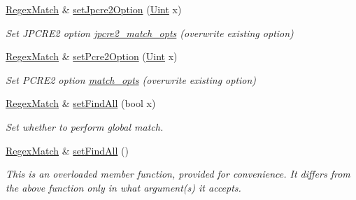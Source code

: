 \begin{DoxyCompactItemize}
\hyperlink{classjpcre2_1_1RegexMatch}{Regex\+Match} \& \hyperlink{classjpcre2_1_1RegexMatch_a0d76033d9c134caa9ddfc21849603920_a0d76033d9c134caa9ddfc21849603920}{set\+Jpcre2\+Option} (\hyperlink{namespacejpcre2_a078242d38221a13fb3543b9edd78c099}{Uint} x)
\begin{DoxyCompactList}\small\item\em Set J\+P\+C\+R\+E2 option \hyperlink{classjpcre2_1_1RegexMatch_a70d62df887eeed237724f64fbc378700}{jpcre2\+\_\+match\+\_\+opts} (overwrite existing option) \end{DoxyCompactList}\item 
\hyperlink{classjpcre2_1_1RegexMatch}{Regex\+Match} \& \hyperlink{classjpcre2_1_1RegexMatch_ae4ab558c2bec0bc9639dbca70ab47496_ae4ab558c2bec0bc9639dbca70ab47496}{set\+Pcre2\+Option} (\hyperlink{namespacejpcre2_a078242d38221a13fb3543b9edd78c099}{Uint} x)
\begin{DoxyCompactList}\small\item\em Set P\+C\+R\+E2 option \hyperlink{classjpcre2_1_1RegexMatch_a697d5731007350b0f20d2018fcfafa90}{match\+\_\+opts} (overwrite existing option) \end{DoxyCompactList}\item 
\hyperlink{classjpcre2_1_1RegexMatch}{Regex\+Match} \& \hyperlink{classjpcre2_1_1RegexMatch_ae586d43ec197c57c66086eeb4f8d83a1_ae586d43ec197c57c66086eeb4f8d83a1}{set\+Find\+All} (bool x)
\begin{DoxyCompactList}\small\item\em Set whether to perform global match. \end{DoxyCompactList}\item 
\hyperlink{classjpcre2_1_1RegexMatch}{Regex\+Match} \& \hyperlink{classjpcre2_1_1RegexMatch_a9e04456a81606362a2ecdf748912e3ea_a9e04456a81606362a2ecdf748912e3ea}{set\+Find\+All} ()
\begin{DoxyCompactList}\small\item\em This is an overloaded member function, provided for convenience. It differs from the above function only in what argument(s) it accepts.


\end{DoxyCompactList}
\end{DoxyCompactItemize}
